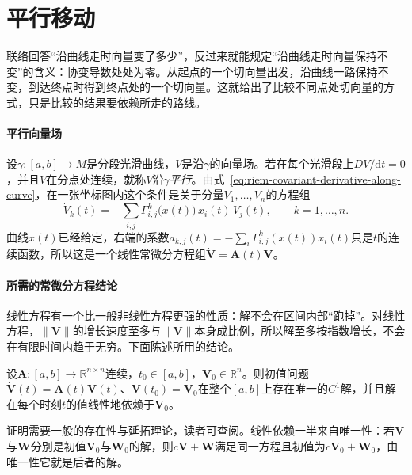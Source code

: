 \section{平行移动}
\label{sec:riem-parallel-transport}

联络回答“沿曲线走时向量变了多少”，反过来就能规定“沿曲线走时向量保持不变”的含义：协变导数处处为零。从起点的一个切向量出发，沿曲线一路保持不变，到达终点时得到终点处的一个切向量。这就给出了比较不同点处切向量的方式，只是比较的结果要依赖所走的路线。

\paragraph{平行向量场}
设$\gamma:[a,b]\to M$是分段光滑曲线，$V$是沿$\gamma$的向量场。若在每个光滑段上$DV/\mathrm dt=0$，并且$V$在分点处连续，就称$V$沿$\gamma$\emph{平行}。由式~\eqref{eq:riem-covariant-derivative-along-curve}，在一张坐标图内这个条件是关于分量$V_1,\ldots,V_n$的方程组
\begin{equation}
\dot V_k(t)=-\sum_{i,j}\Gamma^k_{i,j}\bigl(x(t)\bigr)\,\dot x_i(t)\,V_j(t),\qquad k=1,\ldots,n .
\label{eq:riem-parallel-equation}
\end{equation}
曲线$x(t)$已经给定，右端的系数$a_{k,j}(t)=-\sum_i\Gamma^k_{i,j}(x(t))\dot x_i(t)$只是$t$的连续函数，所以这是一个线性常微分方程组$\dot{\bm V}=\bm A(t)\bm V$。

\paragraph{所需的常微分方程结论}
线性方程有一个比一般非线性方程更强的性质：解不会在区间内部“跑掉”。对线性方程，$\lVert\bm V\rVert$的增长速度至多与$\lVert\bm V\rVert$本身成比例，所以解至多按指数增长，不会在有限时间内趋于无穷。下面陈述所用的结论。

\begin{theorem}[线性常微分方程的整体存在唯一性]
\label{thm:riem-linear-ode}
设$\bm A:[a,b]\to\mathbb R^{n\times n}$连续，$t_0\in[a,b]$，$\bm V_0\in\mathbb R^n$。则初值问题$\dot{\bm V}(t)=\bm A(t)\bm V(t)$、$\bm V(t_0)=\bm V_0$在整个$[a,b]$上存在唯一的$C^1$解，并且解在每个时刻$t$的值线性地依赖于$\bm V_0$。
\end{theorem}

证明需要一般的存在性与延拓理论，读者可查阅。线性依赖一半来自唯一性：若$\bm V$与$\bm W$分别是初值$\bm V_0$与$\bm W_0$的解，则$c\bm V+\bm W$满足同一方程且初值为$c\bm V_0+\bm W_0$，由唯一性它就是后者的解。

